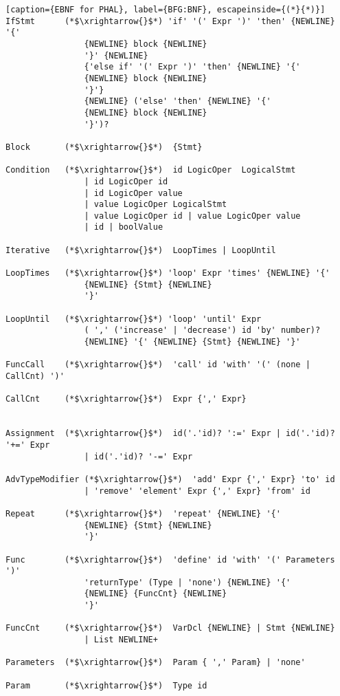 \begin{lstlisting}[caption={EBNF for PHAL}, label={BFG:BNF}, escapeinside={(*}{*)}]
IfStmt	    (*$\xrightarrow{}$*) 'if' '(' Expr ')' 'then' {NEWLINE} '{' 
                {NEWLINE} block {NEWLINE} 
                '}' {NEWLINE} 
                {'else if' '(' Expr ')' 'then' {NEWLINE} '{' 
                {NEWLINE} block {NEWLINE} 
                '}'} 
                {NEWLINE} ('else' 'then' {NEWLINE} '{' 
                {NEWLINE} block {NEWLINE} 
                '}')? 

Block       (*$\xrightarrow{}$*)  {Stmt}
            
Condition   (*$\xrightarrow{}$*)  id LogicOper  LogicalStmt  
                | id LogicOper id  
                | id LogicOper value  
                | value LogicOper LogicalStmt
                | value LogicOper id | value LogicOper value  
                | id | boolValue

Iterative   (*$\xrightarrow{}$*)  LoopTimes | LoopUntil

LoopTimes   (*$\xrightarrow{}$*) 'loop' Expr 'times' {NEWLINE} '{' 
                {NEWLINE} {Stmt} {NEWLINE} 
                '}'

LoopUntil   (*$\xrightarrow{}$*) 'loop' 'until' Expr 
                ( ',' ('increase' | 'decrease') id 'by' number)? 
                {NEWLINE} '{' {NEWLINE} {Stmt} {NEWLINE} '}'  

FuncCall    (*$\xrightarrow{}$*)  'call' id 'with' '(' (none | CallCnt) ')'

CallCnt	    (*$\xrightarrow{}$*)  Expr {',' Expr}


Assignment  (*$\xrightarrow{}$*)  id('.'id)? ':=' Expr | id('.'id)? '+=' Expr  
                | id('.'id)? '-=' Expr

AdvTypeModifier (*$\xrightarrow{}$*)  'add' Expr {',' Expr} 'to' id  
                | 'remove' 'element' Expr {',' Expr} 'from' id

Repeat      (*$\xrightarrow{}$*)  'repeat' {NEWLINE} '{' 
                {NEWLINE} {Stmt} {NEWLINE} 
                '}' 

Func	    (*$\xrightarrow{}$*)  'define' id 'with' '(' Parameters ')' 
                'returnType' (Type | 'none') {NEWLINE} '{' 
                {NEWLINE} {FuncCnt} {NEWLINE}
                '}'

FuncCnt     (*$\xrightarrow{}$*)  VarDcl {NEWLINE} | Stmt {NEWLINE}  
                | List NEWLINE+

Parameters  (*$\xrightarrow{}$*)  Param { ',' Param} | 'none'

Param	    (*$\xrightarrow{}$*)  Type id


\end{lstlisting}

